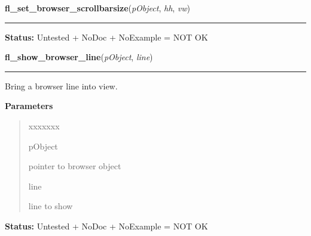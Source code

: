     \label{xformslib:library:fl_set_browser_scrollbarsize}

    \vspace{0.5ex}

\hspace{.8\funcindent}\begin{boxedminipage}{\funcwidth}

    \raggedright \textbf{fl\_set\_browser\_scrollbarsize}(\textit{pObject}, \textit{hh}, \textit{vw})

    \vspace{-1.5ex}

    \rule{\textwidth}{0.5\fboxrule}
\setlength{\parskip}{2ex}
\setlength{\parskip}{1ex}
\textbf{Status:} Untested + NoDoc + NoExample = NOT OK



    \end{boxedminipage}

    \label{xformslib:library:fl_show_browser_line}

    \vspace{0.5ex}

\hspace{.8\funcindent}\begin{boxedminipage}{\funcwidth}

    \raggedright \textbf{fl\_show\_browser\_line}(\textit{pObject}, \textit{line})

    \vspace{-1.5ex}

    \rule{\textwidth}{0.5\fboxrule}
\setlength{\parskip}{2ex}
    Bring a browser line into view.

\setlength{\parskip}{1ex}
      \textbf{Parameters}
      \vspace{-1ex}

      \begin{quote}
        \begin{Ventry}{xxxxxxx}

          \item[pObject]

          pointer to browser object

          \item[line]

          line to show

        \end{Ventry}

      \end{quote}

\textbf{Status:} Untested + NoDoc + NoExample = NOT OK



    \end{boxedminipage}

